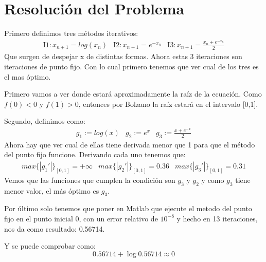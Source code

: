 \documentclass[a4paper]{article}
\begin{document}
\section{Resolución del Problema}
Primero definimos tres métodos iterativos:
\begin{equation}
\begin{array}{ccc}
\mathrm{I1:}x_{n+1}=log(x_{n}) & \mathrm{I2:}x_{n+1}=e^{-x_{n}} & \mathrm{I3:}x_{n+1}=\frac{x_{n}+e^{-x_{n}}}{2}
\end{array}
\end{equation}
Que surgen de despejar x de distintas formas. Ahora estas 3 iteraciones son iteraciones de punto fijo. Con lo cual primero tenemos que ver cual de los tres es el mas óptimo.

Primero vamos a ver donde estará aproximadamente la raíz de la ecuación. Como $f(0)<0$ y $f(1)>0$, entonces por Bolzano la raíz estará en el intervalo [0,1].

Segundo, definimos como:
\begin{equation}
\begin{array}{ccc}
g_{1}:=log(x) & g_{2}:=e^{x} & g_{3}:=\frac{x+e^{-x}}{2}
\end{array}
\end{equation}
Ahora hay que ver cual de ellas tiene derivada menor que 1 para que el método del punto fijo funcione. Derivando cada uno tenemos que:
\begin{equation}
\begin{array}{ccc}
max\{|g_{1}'|\}_{[0,1]}=+\infty & max\{|g_{2}'|\}_{[0,1]}=0.36 & max\{|g_{3}'|\}_{[0,1]}=0.31
\end{array}
\end{equation}
Vemos que las funciones que cumplen la condición son $g_{3}$ y $g_{2}$ y como $g_{3}$ tiene menor valor, el más óptimo es $g_{3}$.

Por último solo tenemos que poner en Matlab que ejecute el metodo del punto fijo en el punto inicial 0, con un error relativo de $10^{-8}$ y hecho en 13 iteraciones, nos da como resultado: 0.56714.

Y se puede comprobar como:
\begin{equation*}
0.56714+\log{0.56714}\approx 0
\end{equation*}
\end{document}
